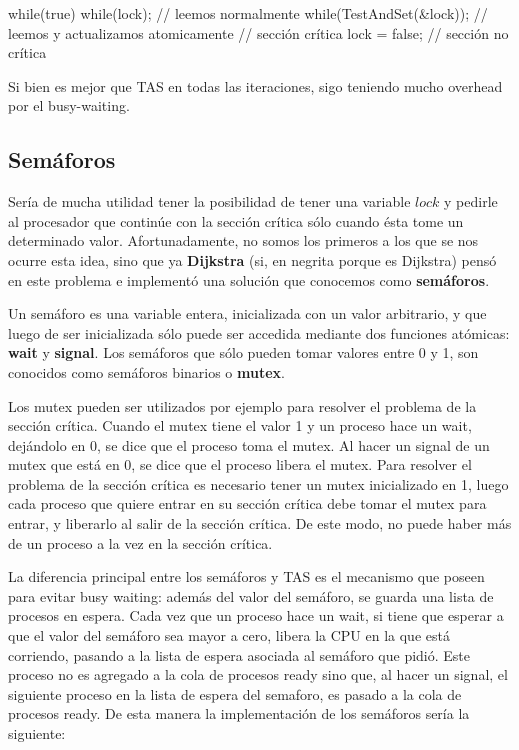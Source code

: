 \documentclass{article}
\begin{document}
\begin{code}
while(true)
{
    while(lock); // leemos normalmente
    while(TestAndSet(&lock)); // leemos y actualizamos atomicamente
		// sección crítica
		lock = false;
		// sección no crítica
}
\end{code}

Si bien es mejor que TAS en todas las iteraciones, sigo teniendo mucho overhead por el busy-waiting.

\subsection{Sem\'aforos}

Ser\'ia de mucha utilidad tener la posibilidad de tener una variable $lock$ y pedirle al procesador que contin\'ue con la secci\'on cr\'itica s\'olo cuando \'esta tome un determinado valor. Afortunadamente, no somos los primeros a los que se nos ocurre esta idea, sino que ya \textbf{Dijkstra} (si, en negrita porque es Dijkstra) pens\'o en este problema e implement\'o una soluci\'on que conocemos como \textbf{sem\'aforos}.

Un sem\'aforo es una variable entera, inicializada con un valor arbitrario, y que luego de ser inicializada s\'olo puede ser accedida mediante dos funciones atómicas: \textbf{wait} y \textbf{signal}. Los semáforos que s\'olo pueden tomar valores entre 0 y 1, son conocidos como sem\'aforos binarios o \textbf{mutex}.

Los mutex pueden ser utilizados por ejemplo para resolver el problema de la secci\'on cr\'itica. Cuando el mutex tiene el valor 1 y un proceso hace un wait, dej\'andolo en 0, se dice que el proceso toma el mutex. Al hacer un signal de un mutex que est\'a en 0, se dice que el proceso libera el mutex. Para resolver el problema de la secci\'on cr\'itica es necesario tener un mutex inicializado en 1, luego cada proceso que quiere entrar en su secci\'on cr\'itica debe tomar el mutex para entrar, y liberarlo al salir de la secci\'on cr\'itica. De este modo, no puede haber m\'as de un proceso a la vez en la secci\'on cr\'itica.

La diferencia principal entre los semáforos y TAS es el mecanismo que poseen para evitar busy waiting: adem\'as del valor del sem\'aforo, se guarda una lista de procesos en espera. Cada vez que un proceso hace un wait, si tiene que esperar a que el valor del sem\'aforo sea mayor a cero, libera la CPU en la que est\'a corriendo, pasando a la lista de espera asociada al sem\'aforo que pidi\'o. Este proceso no es agregado a la cola de procesos ready sino que, al hacer un signal, el siguiente proceso en la lista de espera del semaforo, es pasado a la cola de procesos ready. De esta manera la implementaci\'on de los sem\'aforos ser\'ia la siguiente:
\end{document}
